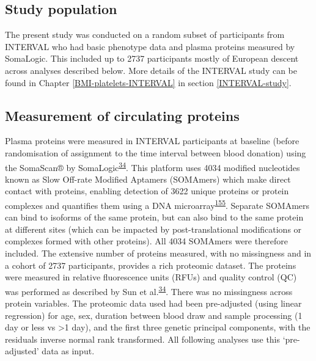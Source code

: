 \documentclass[11pt,twoside]{bristolthesis}
\begin{document}
\hypertarget{study-population-2}{%
\subsection{Study population}\label{study-population-2}}

The present study was conducted on a random subset of participants from INTERVAL who had basic phenotype data and plasma proteins measured by SomaLogic. This included up to 2737 participants mostly of European descent across analyses described below. More details of the INTERVAL study can be found in Chapter \ref{BMI-platelets-INTERVAL} in section \ref{INTERVAL-study}.

\hypertarget{measurement-of-circulating-proteins}{%
\subsection{Measurement of circulating proteins}\label{measurement-of-circulating-proteins}}

Plasma proteins were measured in INTERVAL participants at baseline (before randomisation of assignment to the time interval between blood donation) using the SomaScan® by SomaLogic\textsuperscript{\protect\hyperlink{ref-Sun2018}{34}}. This platform uses 4034 modified nucleotides known as Slow Off-rate Modified Aptamers (SOMAmers) which make direct contact with proteins, enabling detection of 3622 unique proteins or protein complexes and quantifies them using a DNA microarray\textsuperscript{\protect\hyperlink{ref-Rohloff2014}{155}}. Separate SOMAmers can bind to isoforms of the same protein, but can also bind to the same protein at different sites (which can be impacted by post-translational modifications or complexes formed with other proteins). All 4034 SOMAmers were therefore included. The extensive number of proteins measured, with no missingness and in a cohort of 2737 participants, provides a rich proteomic dataset. The proteins were measured in relative fluorescence units (RFUs) and quality control (QC) was performed as described by Sun et al.\textsuperscript{\protect\hyperlink{ref-Sun2018}{34}}. There was no missingness across protein variables. The proteomic data used had been pre-adjusted (using linear regression) for age, sex, duration between blood draw and sample processing (1 day or less vs \textgreater1 day), and the first three genetic principal components, with the residuals inverse normal rank transformed. All following analyses use this `pre-adjusted' data as input.
\end{document}
